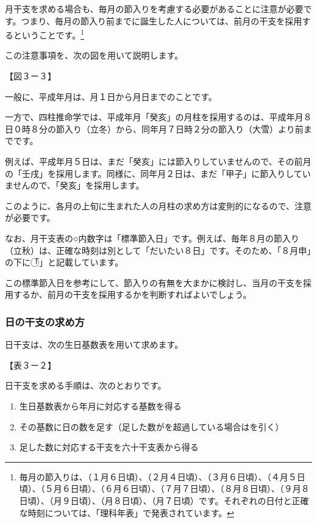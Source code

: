 \documentclass[a5paper,11pt,dvipdfmx]{tarticle}
\begin{document}
月干支を求める場合も、毎月の節入りを考慮する必要があることに注意が必要です。つまり、毎月の節入り前までに誕生した人については、前月の干支を採用するということです。\footnote{毎月の節入りは、（１月６日頃）、（２月４日頃）、（３月６日頃）、（４月５日頃）、（５月６日頃）、（６月６日頃）、（７月７日頃）、（８月８日頃）、（９月８日頃）、（月９日頃）、（月８日頃）、（月７日頃）です。それぞれの日付と正確な時刻については、「理科年表」で発表されています。}

この注意事項を、次の図を用いて説明します。

【図３ー３】

一般に、平成年月は、月１日から月日までのことです。

一方で、四柱推命学では、平成年月「癸亥」の月柱を採用するのは、平成年月８日０時８分の節入り（立冬）から、同年月７日時２分の節入り（大雪）より前までです。

例えば、平成年月５日は、まだ「癸亥」には節入りしていませんので、その前月の「壬戌」を採用します。同様に、同年月２日は、まだ「甲子」に節入りしていませんので、「癸亥」を採用します。

このように、各月の上旬に生まれた人の月柱の求め方は変則的になるので、注意が必要です。

なお、月干支表の○内数字は「標準節入日」です。例えば、毎年８月の節入り（立秋）は、正確な時刻は別として「だいたい８日」です。そのため、「８月申」の下に「\textcircled{}」と記載しています。

この標準節入日を参考にして、節入りの有無を大まかに検討し、当月の干支を採用するか、前月の干支を採用するかを判断すればよいでしょう。


\subsubsection*{日の干支の求め方}

日干支は、次の生日基数表を用いて求めます。

【表３ー２】

日干支を求める手順は、次のとおりです。

\begin{enumerate}
\item 生日基数表から年月に対応する基数を得る
\item その基数に日の数を足す（足した数がを超過している場合はを引く）
\item 足した数に対応する干支を六十干支表から得る
\end{enumerate}
\end{document}
